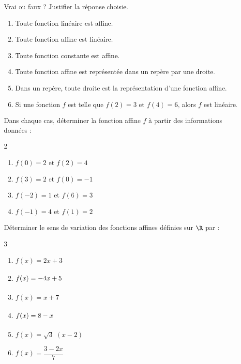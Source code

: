 \exo

Vrai ou faux ? Justifier la réponse choisie.
\begin{enumerate}
\item Toute fonction linéaire est affine.
\item Toute fonction affine est linéaire.
\item Toute fonction constante est affine.
\item Toute fonction affine est représentée dans un repère par une droite.
\item Dans un repère, toute droite est la représentation d'une fonction affine.
\item Si une fonction $f$ est telle que $f(2)=3$ et $f(4)=6$, alors $f$ est linéaire.
\end{enumerate}

\exo

Dans chaque cas, déterminer la fonction affine $f$ à partir des informations données :

\vspace{-8pt}
\setlength{\columnsep}{1cm}
\setlength{\columnseprule}{0pt}
\begin{multicols}{2}
\begin{enumerate}
\item $f(0)=2$ et $f(2)=4$
\smallskip
\item $f(3)=2$ et $f(0)=-1$
\item $f(-2)=1$ et $f(6)=3$
\smallskip
\item $f(-1)=4$ et $f(1)=2$
\end{enumerate}
\end{multicols}
\vspace{-6pt}

\exo

Déterminer le sens de variation des fonctions affines définies sur $\R$ par :

\vspace{-8pt}
\setlength{\columnsep}{1cm}
\setlength{\columnseprule}{0pt}
\begin{multicols}{3}
\begin{enumerate}
\item $f(x)=2x+3$
\smallskip
\item $f(x)=-4x+5\vphantom{\dfrac{2}{7}}$
\item $f(x)=x+7$
\smallskip
\item $f(x)=8-x\vphantom{\dfrac{2}{7}}$
\item $f(x)=\sqrt{3}\;(x-2)$
\smallskip
\item $f(x)=\dfrac{3-2x}{7}$
\end{enumerate}
\end{multicols}
\vspace{-6pt}

